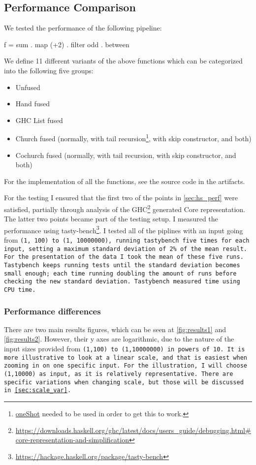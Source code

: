 \subsection{Performance Comparison}\label{sec:hask_perf}
We tested the performance of the following pipeline:
\begin{spec}
f = sum . map (+2) . filter odd . between
\end{spec}
We define 11 different variants of the above functions which can be categorized into the following five groups:
\begin{itemize}[noitemsep]
\item Unfused
\item Hand fused
\item GHC List fused
\item Church fused (normally, with tail recursion\footnote{\href{https://gitlab.haskell.org/ghc/ghc/-/wikis/one-shot}{oneShot} needed to be used in order to get this to work.}, with skip constructor, and both)
\item Cochurch fused (normally, with tail recursion, with skip constructor, and both)
\end{itemize}
For the implementation of all the functions, see the source code in the artifacts.

For the testing I ensured that the first two of the points in \ref{sec:hs_perf} were satisfied, partially through analysis of the GHC\footnote{\url{https://downloads.haskell.org/ghc/latest/docs/users_guide/debugging.html\#core-representation-and-simplification}} generated Core representation.
The latter two points became part of the testing setup.
I measured the performance using tasty-bench\footnote{\url{https://hackage.haskell.org/package/tasty-bench}}.
I tested all of the piplines with an input going from \tt{(1, 100)} to \tt{(1, 10000000)},
running tastybench five times for each input, setting a maximum standard deviation of 2\% of the mean result.
For the presentation of the data I took the mean of these five runs.
Tastybench keeps running tests until the standard deviation becomes small enough; each time running doubling the amount of runs before checking the new standard deviation.
Tastybench measured time using CPU time.

\subsubsection{Performance differences}
There are two main results figures, which can be seen at \autoref{fig:results1} and \autoref{fig:results2}.
However, their y axes are logarithmic, due to the nature of the input sizes provided from \tt{(1,100)} to \tt{(1,10000000)} in powers of 10.
It is more illustrative to look at a linear scale, and that is easiest when zooming in on one specific input.
For the illustration, I will choose \tt{(1,10000)} as input, as it is relatively representative.
There are specific variations when changing scale, but those will be discussed in \autoref{sec:scale_var}.

